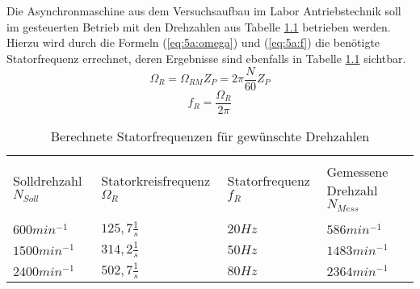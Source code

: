\chapter{}
\section{}

Die Asynchronmaschine aus dem Versuchsaufbau im Labor Antriebstechnik soll im gesteuerten Betrieb mit den Drehzahlen aus Tabelle \ref{tab:5a:Drehzahlen} betrieben werden. Hierzu wird durch die Formeln (\ref{eq:5a:omega}) und (\ref{eq:5a:f}) die benötigte Statorfrequenz errechnet, deren Ergebnisse sind ebenfalls in Tabelle \ref{tab:5a:Drehzahlen} sichtbar.
\begin{equation}
	\Omega_{R} = \Omega_{RM}Z_{P} = 2\pi\frac{N}{60}Z_{P}
	\label{eq:5a:omega}
\end{equation}
\begin{equation}
	f_{R} = \frac{\Omega_{R}}{2\pi}
\label{eq:5a:f}
\end{equation}

\begin{table}[h]
	\centering
	\begin{tabular}{p{3.5cm} | p{3.5cm} | p{3.5cm} | p{3.5cm}}
		&&&\\[-1em]
		Solldrehzahl $ N_{Soll} $ & Statorkreisfrequenz $ \Omega_{R} $ & Statorfrequenz $ f_{R} $ &  Gemessene Drehzahl $ N_{Mess} $\\
		\hline &&&\\[-1em]
		$ 600 min^{-1} $ & $ 125,7\frac{1}{s} $ & $ 20Hz $ & $ 586 min^{-1} $\\
		$ 1500 min^{-1} $ & $ 314,2\frac{1}{s} $ & $ 50Hz $ & $ 1483 min^{-1} $ \\
		$ 2400 min^{-1} $ & $ 502,7\frac{1}{s} $ & $ 80Hz $ & $ 2364 min^{-1} $ \\
	\end{tabular}
	\caption{Berechnete Statorfrequenzen für gewünschte Drehzahlen}
	\label{tab:5a:Drehzahlen}
\end{table}